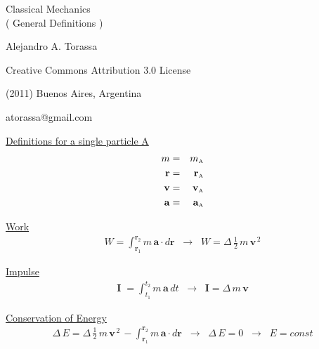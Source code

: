 \documentclass[11pt,fleqn]{article}
\begin{document}
\vspace*{\fill}

\begin{center}

{\fontsize{24}{24}\selectfont Classical Mechanics} \\
\vspace{+0.54em}
{\fontsize{17}{17}\selectfont ( General Definitions )}

\medskip \medskip \medskip \medskip

{\fontsize{13}{13}\selectfont Alejandro A. Torassa}

\medskip \medskip \medskip \medskip

\footnotesize

Creative Commons Attribution 3.0 License

(2011) Buenos Aires, Argentina

atorassa@gmail.com

\end{center}

\vspace*{\fill}

\normalsize

\newpage

{\underline {Definitions for a single particle A}}
\medskip
\begin{eqnarray*}
m & = & m_{\mbox {\tiny A}} \\
\mathbf{r} & = & \mathbf{r}_{\mbox {\tiny A}} \\
\mathbf{v} & = & \mathbf{v}_{\mbox {\tiny A}} \\
\mathbf{a} & = & \mathbf{a}_{\mbox {\tiny A}}
\end{eqnarray*}

\medskip

{\underline {Work}}
\medskip
\begin{eqnarray*}
W = \int_{\mathbf{r}_1}^{\mathbf{r}_2} m \, \mathbf{a} \cdot d\mathbf{r} \; \; \rightarrow \; \; W = \Delta \, {\textstyle \frac{1}{2}} \, m \, \mathbf{v}^{\, 2}
\end{eqnarray*}

\medskip

{\underline {Impulse}}
\medskip
\begin{eqnarray*}
\mathbf{I} \; = \int_{t_1}^{t_2} m \, \mathbf{a} \, dt \; \; \rightarrow \; \; \mathbf{I} = \Delta \, m \, \mathbf{v}
\end{eqnarray*}

\medskip

{\underline {Conservation of Energy}}
\medskip
\begin{eqnarray*}
\Delta \, E = \Delta \, {\textstyle \frac{1}{2}} \, m \, \mathbf{v}^{\, 2} \, - \int_{\mathbf{r}_1}^{\mathbf{r}_2} m \, \mathbf{a} \cdot d\mathbf{r} \; \; \rightarrow \; \; \Delta \, E = 0 \; \; \rightarrow \; \; E = const
\end{eqnarray*}
\end{document}
